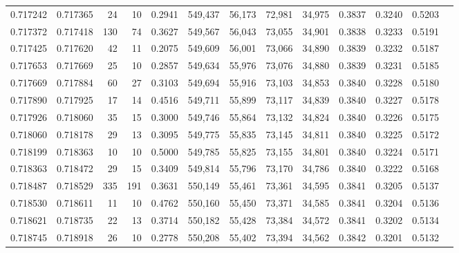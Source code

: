 \begin{tabular}{rrrrrrrrrrrrr}
0.717242 & 0.717365 &    24 &  10 &                                     0.2941 & 549,437 &  56,173 &  72,981 &  34,975 & 0.3837 & 0.3240 & 0.5203 \\
0.717372 & 0.717418 &   130 &  74 &                                     0.3627 & 549,567 &  56,043 &  73,055 &  34,901 & 0.3838 & 0.3233 & 0.5191 \\
0.717425 & 0.717620 &    42 &  11 &                                     0.2075 & 549,609 &  56,001 &  73,066 &  34,890 & 0.3839 & 0.3232 & 0.5187 \\
0.717653 & 0.717669 &    25 &  10 &                                     0.2857 & 549,634 &  55,976 &  73,076 &  34,880 & 0.3839 & 0.3231 & 0.5185 \\
0.717669 & 0.717884 &    60 &  27 &                                     0.3103 & 549,694 &  55,916 &  73,103 &  34,853 & 0.3840 & 0.3228 & 0.5180 \\
0.717890 & 0.717925 &    17 &  14 &                                     0.4516 & 549,711 &  55,899 &  73,117 &  34,839 & 0.3840 & 0.3227 & 0.5178 \\
0.717926 & 0.718060 &    35 &  15 &                                     0.3000 & 549,746 &  55,864 &  73,132 &  34,824 & 0.3840 & 0.3226 & 0.5175 \\
0.718060 & 0.718178 &    29 &  13 &                                     0.3095 & 549,775 &  55,835 &  73,145 &  34,811 & 0.3840 & 0.3225 & 0.5172 \\
0.718199 & 0.718363 &    10 &  10 &                                     0.5000 & 549,785 &  55,825 &  73,155 &  34,801 & 0.3840 & 0.3224 & 0.5171 \\
0.718363 & 0.718472 &    29 &  15 &                                     0.3409 & 549,814 &  55,796 &  73,170 &  34,786 & 0.3840 & 0.3222 & 0.5168 \\
0.718487 & 0.718529 &   335 & 191 &                                     0.3631 & 550,149 &  55,461 &  73,361 &  34,595 & 0.3841 & 0.3205 & 0.5137 \\
0.718530 & 0.718611 &    11 &  10 &                                     0.4762 & 550,160 &  55,450 &  73,371 &  34,585 & 0.3841 & 0.3204 & 0.5136 \\
0.718621 & 0.718735 &    22 &  13 &                                     0.3714 & 550,182 &  55,428 &  73,384 &  34,572 & 0.3841 & 0.3202 & 0.5134 \\
0.718745 & 0.718918 &    26 &  10 &                                     0.2778 & 550,208 &  55,402 &  73,394 &  34,562 & 0.3842 & 0.3201 & 0.5132 \\

\end{tabular}
